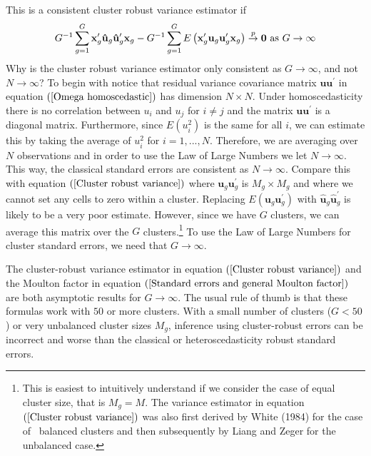 \documentclass{article}
\begin{document}
This is a consistent cluster robust variance estimator if%
\begin{equation*}
G^{-1}\sum_{g=1}^{G}\mathbf{x}_{g}^{\prime }\mathbf{\hat{u}}_{g}\mathbf{\hat{%
u}}_{g}^{\prime }\mathbf{x}_{g}-G^{-1}\sum_{g=1}^{G}E\left( \mathbf{x}%
_{g}^{\prime }\mathbf{u}_{g}\mathbf{u}_{g}^{\prime }\mathbf{x}_{g}\right) 
\overset{p}{\rightarrow }\mathbf{0}\text{ as }G\rightarrow \infty
\end{equation*}%
Why is the cluster robust variance estimator only consistent as $%
G\rightarrow \infty $, and not $N\rightarrow \infty $? To begin with notice
that residual variance covariance matrix $\mathbf{uu}^{\prime }$ in equation 
$\left( \ref{Omega homoscedastic}\right) $ has dimension $N\times N$. Under
homoscedasticity there is no correlation between $u_{i}$ and $u_{j}$ for $%
i\neq j$ and the matrix $\mathbf{uu}^{\prime }$ is a diagonal matrix.
Furthermore, since $E\left( u_{i}^{2}\right) $ is the same for all $i$, we
can estimate this by taking the average of $u_{i}^{2}$ for $i=1,...,N$.
Therefore, we are averaging over $N$ observations and in order to use the
Law of Large Numbers we let $N\rightarrow \infty $. This way, the classical
standard errors are consistent as $N\rightarrow \infty $. Compare this with
equation $\left( \ref{Cluster robust variance}\right) $ where $\mathbf{u}_{g}%
\mathbf{u}_{g}^{\prime }$ is $M_{g}\times M_{g}$ and where we cannot set any
cells to zero within a cluster. Replacing $E\left( \mathbf{u}_{g}\mathbf{u}%
_{g}^{\prime }\right) $ with $\mathbf{\hat{u}}_{g}\mathbf{\hat{u}}%
_{g}^{\prime }$ is likely to be a very poor estimate. However, since we have 
$G$ clusters, we can average this matrix over the $G$ clusters.\footnote{%
This is easiest to intuitively understand if we consider the case of equal
cluster size, that is $M_{g}=M$. The variance estimator in equation $\left( %
\ref{Cluster robust variance}\right) $ was also first derived by White
(1984) for the case of \ balanced clusters and then subsequently by Liang
and Zeger for the unbalanced case.} To use the Law of Large Numbers for
cluster standard errors, we need that $G\rightarrow \infty $.

The cluster-robust variance estimator in equation $\left( \ref{Cluster
robust variance}\right) $ and the Moulton factor in equation $\left( \ref%
{Standard errors and general Moulton factor}\right) $ are both asymptotic
results for $G\rightarrow \infty $. The usual rule of thumb is that these
formulas work with $50$ or more clusters. With a small number of clusters ($%
G<50$) or very unbalanced cluster sizes $M_{g}$, inference using
cluster-robust errors can be incorrect and worse than the classical or
heteroscedasticity robust standard errors.
\end{document}
